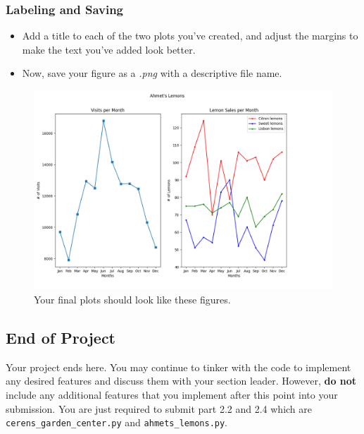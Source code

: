 \documentclass[a4paper]{article}
\begin{document}
\newpage

\subsubsection{Labeling and Saving}

\begin{itemize}
\item
Add a title to each of the two plots you’ve created, and adjust the margins to make the text you’ve added look better.

\item
Now, save your figure as a \textit{.png} with a descriptive file name.
\end{itemize}{}

\begin{figure}[htb]
\centering
\includegraphics[height=0.8\textwidth]{ahmets_lemons.png}
\caption{Your final plots should look like these figures.}\label{fig:final}
\end{figure}

\subsection{End of Project}
Your project ends here. You may continue to tinker with the code to implement any desired features and discuss them with your section leader. However, \textbf{do not} include any additional features that you implement after this point into your submission. You are just required to submit part 2.2 and 2.4 which are \texttt{cerens\_garden\_center.py} and \texttt{ahmets\_lemons.py}.
\end{document}
